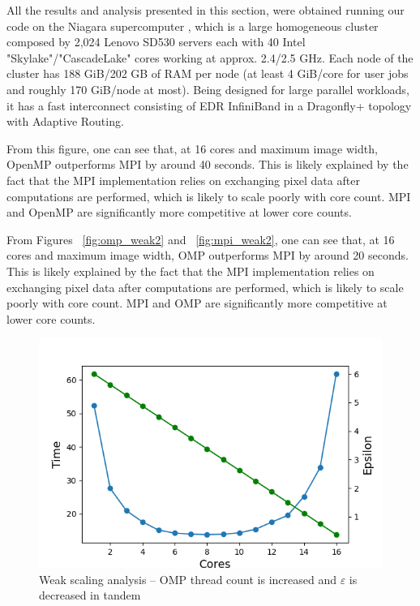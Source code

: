 

All the results and analysis presented in this section, were obtained
running our code on the Niagara supercomputer \cite{10.1145/3332186.3332195},
which is a large homogeneous cluster composed by 2,024 Lenovo SD530 servers
each with 40 Intel "Skylake"/"CascadeLake" cores working at approx. 2.4/2.5 GHz.
Each node of the cluster has 188 GiB/202 GB of RAM per node (at least 4 GiB/core for user jobs and roughly 170 GiB/node at most).
Being designed for large parallel workloads, it has a fast interconnect consisting of EDR InfiniBand in a Dragonfly+ topology with Adaptive Routing.


From this figure,  one can see that, at 16 cores and maximum image width, OpenMP outperforms MPI by around 40 seconds. This is likely explained by the fact that the MPI implementation relies on exchanging pixel data after computations are performed, which is likely to scale poorly with core count. MPI and OpenMP are significantly more competitive at lower core counts.


From Figures ~\ref{fig:omp_weak2} and ~\ref{fig:mpi_weak2}, one can see that, at 16 cores and maximum image width, OMP outperforms MPI by around 20 seconds. This is likely explained by the fact that the MPI implementation relies on exchanging pixel data after computations are performed, which is likely to scale poorly with core count. MPI and OMP are significantly more competitive at lower core counts.


\begin{figure}[h]
  \centering
  \includegraphics[width=0.55\linewidth]{figs/omp_weak.out}
	\caption{Weak scaling analysis -- OMP thread count is increased and $\varepsilon$ is decreased in tandem}
    \label{fig:omp_weak}
\end{figure}


